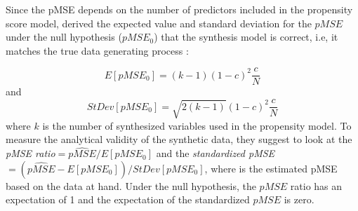 Since the pMSE depends on the number of predictors included in the propensity score model, \textcite{Snoke_RSSA2018} derived the expected value and standard deviation for the $pMSE$ under the null hypothesis ($pMSE_0$) that the synthesis model is correct, i.e, it matches the true data generating process \parencite[Equation 1]{Snoke_RSSA2018}:

$$
E[pMSE_0] = (k-1)(1-c)^2 \frac{c}{N}
$$
and
$$
StDev[pMSE_0] = \sqrt{2(k-1)}(1-c)^2 \frac{c}{N}
$$
where $k$ is the number of synthesized variables used in the propensity model. To measure the analytical validity of the synthetic data, they suggest to look at the \textit{pMSE  ratio}$ = \widehat{pMSE}/E[pMSE_0]$ and the \textit{standardized pMSE}$=(\widehat{pMSE}-E[pMSE_0])/StDev[pMSE_0]$, where  is the estimated pMSE based on the data at hand. Under the null hypothesis, the $pMSE$ ratio has an expectation of 1 and the expectation of the standardized $pMSE$ is zero.

